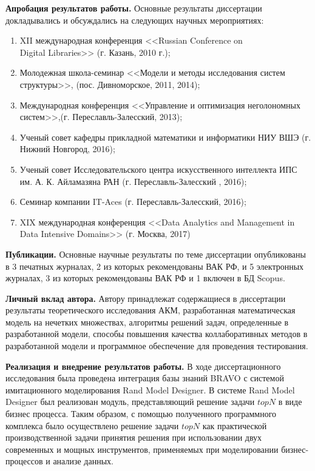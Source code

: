 {\bf Апробация результатов работы.}
Основные результаты диссертации докладывались и обсуждались на следующих научных мероприятиях:
\begin{enumerate}
\item XII международная конференция <<Russian Conference on \\Digital Libraries>>
	(г. Казань, 2010 г.);
\item Молодежная школа-семинар <<Модели и методы исследования систем
	структуры>>, (пос. Дивноморское, 2011, 2014);
\item Международная конференция <<Управление и оптимизация неголономных
	систем>>,(г. Переславль-Залесский, 2013);
\item Ученый совет кафедры прикладной математики и информатики
	НИУ ВШЭ (г. Нижний Новгород, 2016);
\item Ученый совет Исследовательского центра искусственного интеллекта
	ИПС им. А. К. Айламазяна РАН (г. Переславль-Залесский , 2016);
\item Семинар компании IT-Aces (г. Переславль-Залесский, 2016);
\item XIX международная конференция <<Data Analytics and Management in Data
	Intensive Domains>> (г. Москва, 2017)
\end{enumerate}

{\bf Публикации.} Основные научные результаты по теме диссертации опубликованы
в 3 печатных журналах, 2 из которых рекомендованы ВАК РФ, и 5 электронных
журналах, 3 из которых рекомендованы ВАК РФ и 1 включен в БД Scopus.

{\bf Личный вклад автора.} Автору принадлежат содержащиеся в
диссертации результаты теоретического исследования АКМ,
разработанная математическая модель на нечетких множествах,
алгоритмы решений задач, определенные в разработанной модели,
способы повышения качества коллаборативных методов в разработанной модели
и программное обеспечение для проведения тестирования.

{\bf Реализация и внедрение результатов работы.}
В ходе диссертационного исследования была проведена интеграция
базы знаний BRAVO с системой имитационного моделирования Rand Model Designer.
В системе Rand Model Designer был реализован модуль, представляющий решение
задачи $topN$ в виде бизнес процесса. Таким образом, с помощью полученного программного
комплекса было осуществлено решение задачи $topN$ как практической производственной задачи
принятия решения при использовании двух современных и мощных инструментов, применяемых
при моделировании бизнес-процессов и анализе данных.

